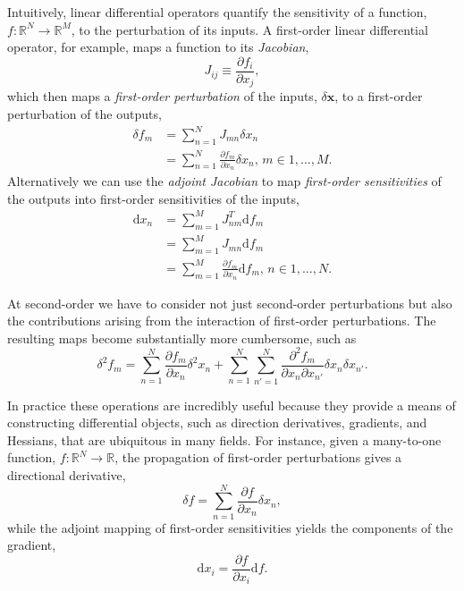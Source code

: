 Intuitively, linear differential operators quantify the sensitivity of a function, 
$f : \mathbb{R}^{N} \rightarrow \mathbb{R}^{M}$, to the perturbation of its inputs.  
A first-order linear differential operator, for example, maps a function to its \textit{Jacobian},
%
\begin{equation*}
J_{ij} \equiv \frac{ \partial f_{i} }{ \partial x_{j} },
\end{equation*}
%
which then maps a \textit{first-order perturbation} of the inputs, $\delta \mathbf{x}$, 
to a first-order perturbation of the outputs,
%
\begin{align*}
\delta f_{m} 
&=
\sum_{n= 1}^{N} J_{mn} \delta x_{n}
\\
&= 
\sum_{n= 1}^{N} \frac{ \partial f_{m} }{ \partial x_{n} } \delta x_{n}, \, m \in 1, \ldots, M.
\end{align*} 
%
Alternatively we can use the \textit{adjoint Jacobian} to map \textit{first-order sensitivities}
of the outputs into first-order sensitivities of the inputs,
%
\begin{align*}
\mathrm{d} x_{n} 
&= 
\sum_{m = 1}^{M} J^{T}_{nm} \mathrm{d} f_{m}
\\
&=
\sum_{m = 1}^{M} J_{mn} \mathrm{d} f_{m}
\\
&=
\sum_{m = 1}^{M} \frac{ \partial f_{m} }{ \partial x_{n} } \mathrm{d} f_{m}, \, n \in 1, \ldots, N.
\end{align*}

At second-order we have to consider not just second-order perturbations but also the 
contributions arising from the interaction of first-order perturbations.  The resulting 
maps become substantially more cumbersome, such as
%
\begin{equation*}
\delta^{2} f_{m} 
= \sum_{n = 1}^{N} \frac{ \partial f_{m} }{ \partial x_{n} } \delta^{2} x_{n} 
+ \sum_{n = 1}^{N} \sum_{n' = 1}^{N} 
\frac{ \partial^{2} f_{m} }{ \partial x_{n} \partial x_{n'} } 
\delta x_{n} \delta x_{n'}.
\end{equation*}

In practice these operations are incredibly useful because they provide a means of
constructing differential objects, such as direction derivatives, gradients, and Hessians, 
that are ubiquitous in many fields.  For instance, given a many-to-one function,
$f : \mathbb{R}^{N} \rightarrow \mathbb{R}$, the propagation of first-order perturbations
gives a directional derivative,
%
\begin{equation*}
\delta f = \sum_{n = 1}^{N} \frac{ \partial f }{ \partial x_{n} } \delta x_{n},
\end{equation*}
%
while the adjoint mapping of first-order sensitivities yields the components of the gradient,
%
\begin{equation*}
\mathrm{d} x_{i} = \frac{ \partial f }{ \partial x_{i} } \mathrm{d} f.
\end{equation*}

